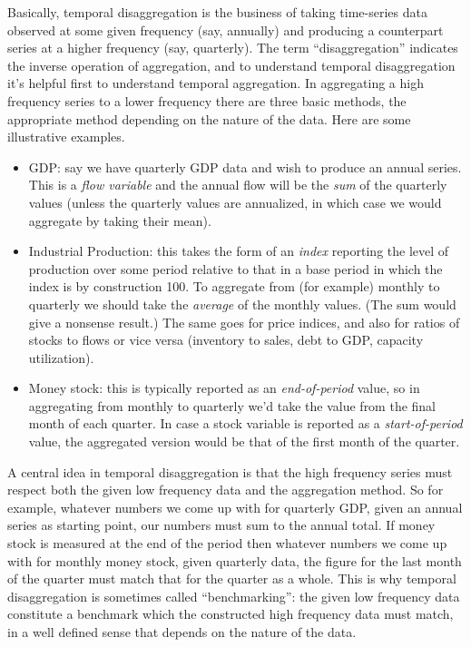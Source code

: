 Basically, temporal disaggregation is the business of taking
time-series data observed at some given frequency (say, annually) and
producing a counterpart series at a higher frequency (say,
quarterly). The term ``disaggregation'' indicates the inverse
operation of aggregation, and to understand temporal disaggregation
it's helpful first to understand temporal aggregation. In aggregating
a high frequency series to a lower frequency there are three basic
methods, the appropriate method depending on the nature of the data.
Here are some illustrative examples.
\begin{itemize}
\item GDP: say we have quarterly GDP data and wish to produce an
  annual series. This is a \textit{flow variable} and the annual flow
  will be the \textit{sum} of the quarterly values (unless the
  quarterly values are annualized, in which case we would aggregate by
  taking their mean).
\item Industrial Production: this takes the form of an \textit{index}
  reporting the level of production over some period relative to that
  in a base period in which the index is by construction 100. To
  aggregate from (for example) monthly to quarterly we should take the
  \textit{average} of the monthly values. (The sum would give a
  nonsense result.) The same goes for price indices, and also for
  ratios of stocks to flows or vice versa (inventory to sales, debt to
  GDP, capacity utilization).
\item Money stock: this is typically reported as an
  \textit{end-of-period} value, so in aggregating from monthly to
  quarterly we'd take the value from the final month of each
  quarter. In case a stock variable is reported as a
  \textit{start-of-period} value, the aggregated version would be that
  of the first month of the quarter.
\end{itemize}

A central idea in temporal disaggregation is that the high frequency
series must respect both the given low frequency data and the
aggregation method. So for example, whatever numbers we come up with
for quarterly GDP, given an annual series as starting point, our
numbers must sum to the annual total. If money stock is measured at
the end of the period then whatever numbers we come up with for
monthly money stock, given quarterly data, the figure for the last
month of the quarter must match that for the quarter as a whole.  This
is why temporal disaggregation is sometimes called ``benchmarking'':
the given low frequency data constitute a benchmark which the
constructed high frequency data must match, in a well defined sense
that depends on the nature of the data.

